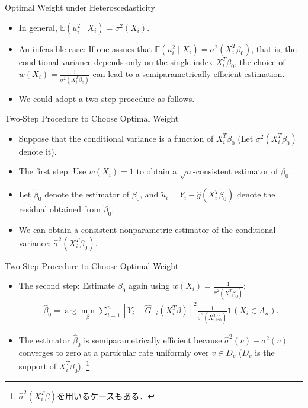 \documentclass[xcolor=svgnames,dvipdfmx,cjk]{beamer}
\theoremstyle{example}
\def\E{\mathbb{E}}
\begin{document}
  \begin{frame}{Optimal Weight under Heteroscedasticity}
    \begin{itemize}
      \item In general, $\E(u_i^2 \mid X_i) = \sigma^2(X_i)$.
      \item \alert{An infeasible case}: 
            If one assues that  $\E(u_i^2 \mid X_i) = \sigma^2(X_i^{T}\beta_0)$,
            that is, the conditional variance depends only on the single index $X_i^{T}\beta_0$,
            the choice of $w(X_i) = \frac{1}{\sigma^2({X_i^{T}\beta_0})}$ can lead to a semiparametrically efficient estimation.
      \item We could adopt a two-step procedure as follows.
    \end{itemize}
  \end{frame}
  
  \begin{frame}{Two-Step Procedure to Choose Optimal Weight}
    \begin{itemize}
      \item Suppose that the conditional variance is a function of $X_i^{T}\beta_0$ (Let $\sigma^2({X_i^{T}\beta_0})$ denote it).
      \item \alert{The first step}: Use $w(X_i)=1$ to obtain a $\sqrt{n}$-consistent estimator of $\beta_0$.
        
      \item Let $\tilde{\beta}_0$ denote the estimator of $\beta_0$, 
            and $\tilde{u}_i = Y_i - \hat{g}(X_i^T \tilde{\beta}_0)$ denote the residual obtained from $\tilde{\beta}_0$.
      \item We can obtain a consistent nonparametric estimator of the conditional variance: $\hat{\sigma}^2({X_i^{T} \tilde{\beta}_0})$.
      \end{itemize}
  \end{frame}

  \begin{frame}{Two-Step Procedure to Choose Optimal Weight}
    \begin{itemize}
      \item \alert{The second step}: Estimate $\beta_0$ again using $w(X_i)= \frac{1}{\hat{\sigma}^2({X_i^{T}\tilde{\beta}_0})}$:
            \begin{align*}
              \hat{\beta}_0 = 
              \arg \min_{\beta} 
              \sum_{i=1}^{n}  
                    \left[ Y_i - \hat{G}_{-i}(X_i^{T}\beta) \right]^2 
                    \frac{1}{\hat{\sigma}^2({X_i^{T}\tilde{\beta}_0})} \mathbf{1}(X_i \in A_n).
            \end{align*}
      \item The estimator $\hat{\beta}_0$ is semiparametrically efficient because
            $\hat{\sigma}^2(v) - \sigma^2(v)$ converges to zero at a particular rate 
            uniformly over $v \in D_v$ ($D_v$ is the support of $X_i^{T}\beta_0$).
            \footnote{$\hat{\sigma}^2({X_i^{T}\beta})$を用いるケースもある．}
    \end{itemize} 
  \end{frame}
\end{document}
